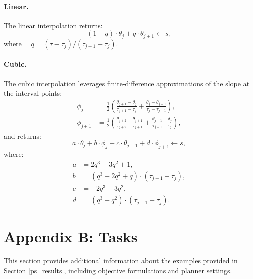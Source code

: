 \paragraph{Linear.}
The linear interpolation returns: 
\begin{equation}
	(1 - q) \cdot \theta_j + q \cdot \theta_{j+1} \leftarrow s,
\end{equation}
where $\quad q = (\tau - \tau_j) / (\tau_{j+1} - \tau_j)$.

\paragraph{Cubic.}
The cubic interpolation leverages finite-difference approximations of the slope at the interval points:
\begin{align}
	\phi_j &= \frac{1}{2} \left(\frac{\theta_{j+1} - \theta_j}{
		\tau_{j+1} - \tau_j} +
	\frac{\theta_j - \theta_{j-1}}{
		\tau_j - \tau_{j-1}} \right),\\
	\phi_{j+1} &= \frac{1}{2} \left(\frac{\theta_{j+2} - \theta_{j+1}}{
		\tau_{j+2} - \tau_{j+1}} +
	\frac{\theta_{j+1} - \theta_{j}}{
		\tau_{j+1} - \tau_{j}} \right),
\end{align}
and returns:
\begin{equation}
	a \cdot \theta_j + b \cdot \phi_j + c \cdot \theta_{j+1} + d \cdot \phi_{j+1} \leftarrow s,
\end{equation}
where:
\begin{align}
	a &= 2 q^3 - 3 q^2 + 1,\\
	b &= (q^3 - 2 q^2 + q) \cdot (\tau_{j+1} - \tau_j),\\
	c &= -2 q^3 + 3 q^2,\\
	d &= (q^3 - q^2) \cdot (\tau_{j+1} - \tau_j).
\end{align}

\section{Appendix B: Tasks}
This section provides additional information about the examples provided in Section \ref{ps_results}, including objective formulations and planner settings.

